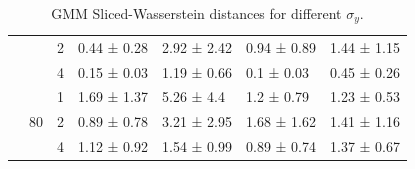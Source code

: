 \begin{table}[ht]
\begin{tabular}{lllllll}
         &  & 2 & 0.44 ± 0.28 & 2.92 ± 2.42 & 0.94 ± 0.89 & 1.44 ± 1.15 \\
         &  & 4 & 0.15 ± 0.03 & 1.19 ± 0.66 & 0.1 ± 0.03 & 0.45 ± 0.26 \\
        \cline{2-7}
         & \multirow[t]{3}{*}{80} & 1 & 1.69 ± 1.37 & 5.26 ± 4.4 & 1.2 ± 0.79 & 1.23 ± 0.53 \\
         &  & 2 & 0.89 ± 0.78 & 3.21 ± 2.95 & 1.68 ± 1.62 & 1.41 ± 1.16 \\
         &  & 4 & 1.12 ± 0.92 & 1.54 ± 0.99 & 0.89 ± 0.74 & 1.37 ± 0.67 \\
        \cline{1-7} \cline{2-7}
        \bottomrule
    \end{tabular}
    \caption{GMM Sliced-Wasserstein distances for different $\sigma_y$.}
    \label{tab:gmm-sigma-split}
\end{table}

\begin{table}[ht]
    \centering
    \caption{Raw scores for SuperConductor experiment (higher values are better).}
    \label{tab:superconductor-unnorm}
\end{table}

